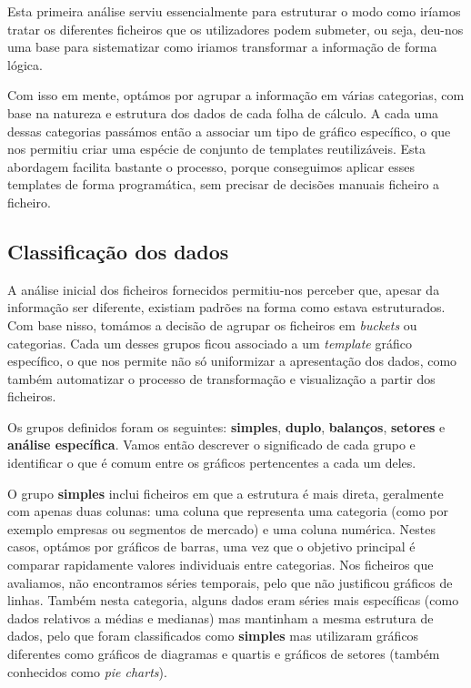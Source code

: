 Esta primeira análise serviu essencialmente para estruturar o modo como iríamos tratar os diferentes ficheiros que os utilizadores podem submeter, ou seja, deu-nos uma base para sistematizar como iriamos transformar a informação de forma lógica.

Com isso em mente, optámos por agrupar a informação em várias categorias, com base na natureza e estrutura dos dados de cada folha de cálculo. A cada uma dessas categorias passámos então a associar um tipo de gráfico específico, o que nos permitiu criar uma espécie de conjunto de templates reutilizáveis. Esta abordagem facilita bastante o processo, porque conseguimos aplicar esses templates de forma programática, sem precisar de decisões manuais ficheiro a ficheiro.

\subsection{Classificação dos dados}

A análise inicial dos ficheiros fornecidos permitiu-nos perceber que, apesar da informação ser diferente,  existiam padrões na forma como estava estruturados. Com base nisso, tomámos a decisão de agrupar os ficheiros em \textit{buckets} ou categorias. Cada um desses grupos ficou associado a um \textit{template} gráfico específico, o que nos permite não só uniformizar a apresentação dos dados, como também automatizar o processo de transformação e visualização a partir dos ficheiros.

Os grupos definidos foram os seguintes: \textbf{simples}, \textbf{duplo}, \textbf{balanços}, \textbf{setores} e \textbf{análise específica}. Vamos então descrever o significado de cada grupo e identificar o que é comum entre os gráficos pertencentes a cada um deles.

O grupo \textbf{simples} inclui ficheiros em que a estrutura é mais direta, geralmente com apenas duas colunas: uma coluna que representa uma categoria (como por exemplo empresas ou segmentos de mercado) e uma coluna numérica. Nestes casos, optámos por gráficos de barras, uma vez que o objetivo principal é comparar rapidamente valores individuais entre categorias. Nos ficheiros que avaliamos, não encontramos séries temporais, pelo que não justificou gráficos de linhas. Também nesta categoria, alguns dados eram séries mais específicas (como dados relativos a médias e medianas) mas mantinham a mesma estrutura de dados, pelo que foram classificados como \textbf{simples} mas utilizaram gráficos diferentes como gráficos de diagramas e quartis e gráficos de setores (também conhecidos como \textit{pie charts}).

